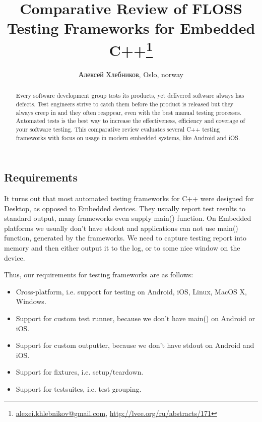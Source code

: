\documentclass[10pt, a5paper]{article}
\begin{document}
\title{Comparative Review of FLOSS Testing Frameworks for Embedded C++\footnote{\url{alexei.khlebnikov@gmail.com}, \url{http://lvee.org/ru/abstracts/171}}}
\author{Алексей Хлебников, Oslo, norway}
\maketitle
\begin{abstract}
Every software development group tests its products, yet delive\-red software always has defects. Test engineers strive to catch them before the product is released but they always creep in and they often reappear, even with the best manual testing processes. Automated tests is the best way to increase \linebreak the effectiveness, efficiency and coverage of your software testing. This comparative review evaluates several C++ testing \linebreak frameworks with focus on usage in modern embedded systems, like Android and iOS.
\end{abstract}
\subsection*{Requirements}

It turns out that most automated testing frameworks for C++ were designed for Desktop, as opposed to Embedded devices. They usually report test results to standard output, many frameworks even supply main() function. On Embedded platforms we usually don't have stdout and applications can not use main() function, generated by the frameworks. We need to capture testing report into memory and then either output it to the log, or to some nice window on the device.

Thus, our requirements for testing frameworks are as follows:

\begin{itemize}
  \item Cross-platform, i.e. support for testing on Android, iOS, Linux, MacOS X, Windows.
  \item Support for custom test runner, because we don't have main() on Android or iOS.
  \item Support for custom outputter, because we don't have stdout on Android and iOS.
  \item Support for fixtures, i.e. setup/teardown.
  \item Support for testsuites, i.e. test grouping.
\end{itemize}
\end{document}
